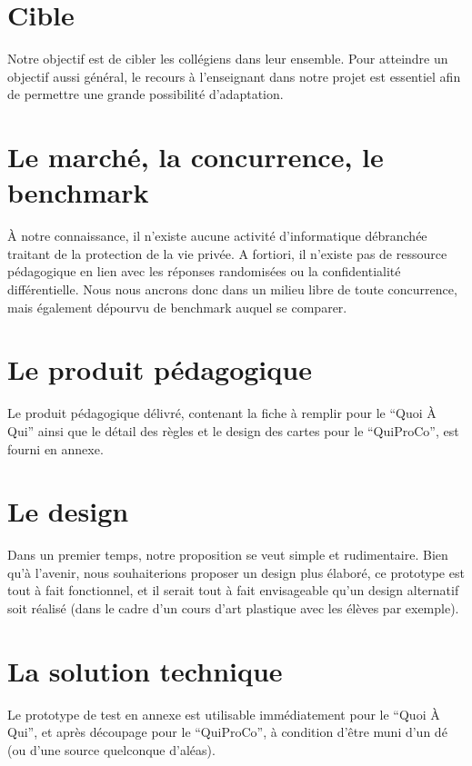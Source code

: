 \documentclass[a4paper]{article}
\begin{document}
\section*{Cible}

Notre objectif est de cibler les collégiens dans leur ensemble.
Pour atteindre un objectif aussi général, le recours à l'enseignant dans notre projet est essentiel afin de permettre une grande possibilité d'adaptation.

\section*{Le marché, la concurrence, le benchmark}

À notre connaissance, il n'existe aucune activité d'informatique débranchée traitant de la protection de la vie privée. A fortiori, il n'existe pas de ressource pédagogique en lien avec les réponses randomisées ou la confidentialité différentielle.
Nous nous ancrons donc dans un milieu libre de toute concurrence, mais également dépourvu de benchmark auquel se comparer.

\section*{Le produit pédagogique}

Le produit pédagogique délivré, contenant la fiche à remplir pour le \enquote{Quoi À Qui} ainsi que le détail des règles et le design des cartes pour le \enquote{QuiProCo}, est fourni en annexe.

\section*{Le design}

Dans un premier temps, notre proposition se veut simple et rudimentaire. Bien qu'à l'avenir, nous souhaiterions proposer un design plus élaboré, ce prototype est tout à fait fonctionnel, et il serait tout à fait envisageable qu'un design alternatif soit réalisé (dans le cadre d'un cours d'art plastique avec les élèves par exemple).

\section*{La solution technique}

Le prototype de test en annexe est utilisable immédiatement pour le \enquote{Quoi À Qui}, et après découpage pour le \enquote{QuiProCo}, à condition d'être muni d'un dé (ou d'une source quelconque d'aléas).
\end{document}
